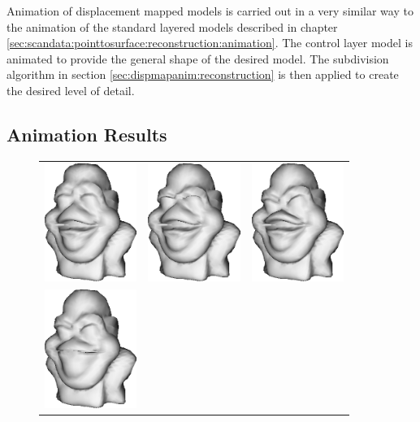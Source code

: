 Animation of displacement mapped models is carried out in a very similar way to the animation of the standard layered models described in chapter \ref{sec:scandata:pointtosurface:reconstruction:animation}. The control layer model is animated to provide the general shape of the desired model. The subdivision algorithm in section \ref{sec:dispmapanim:reconstruction} is then applied to create the desired level of detail.

\subsection{\label{sec:dispmapanim:animation:results}Animation Results}

\begin{figure}
\begin{center}
\begin{tabular}{ccc}
\includegraphics[width=3cm]{../images/dispanim_1} &
\includegraphics[width=3cm]{../images/dispanim_2} &
\includegraphics[width=3cm]{../images/dispanim_3} \\
\includegraphics[width=3cm]{../images/dispanim_4} &

\end{tabular}
\end{center}
\end{figure}
